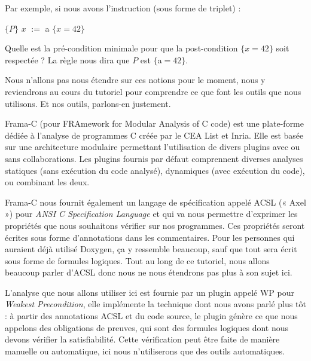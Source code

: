 \documentclass[middle]{zmdocument}
\begin{document}
Par exemple, si nous avons l'instruction (sous forme de triplet) :



$\{P\}$ $x$ $:=$ a $\{x = 42\}$



Quelle est la pré-condition minimale pour que la post-condition $\{x = 42\}$ 
soit respectée ? La règle nous dira que $P$ est $\{$a$=42\}$.



Nous n'allons pas nous étendre sur ces notions pour le moment, nous y 
reviendrons au cours du tutoriel pour comprendre ce que font les outils que
nous utilisons. Et nos outils, parlons-en justement.






\begin{center}


\end{center}




Frama-C (pour FRAmework for Modular Analysis of C code) est une plate-forme
 dédiée à l'analyse de programmes C créée par le CEA List et Inria. Elle est 
 basée sur une architecture modulaire permettant l'utilisation de divers 
 plugins avec ou sans collaborations. Les plugins fournis par défaut 
 comprennent diverses analyses statiques (sans exécution du code analysé), 
 dynamiques (avec exécution du code), ou combinant les deux.



Frama-C nous fournit également un langage de spécification appelé ACSL (« Axel »)
pour \textit{ANSI C Specification Language} et qui va nous permettre d'exprimer les 
propriétés que nous souhaitons vérifier sur nos programmes. Ces propriétés seront
écrites sous forme d'annotations dans les commentaires. Pour les personnes qui 
auraient déjà utilisé Doxygen, ça y ressemble beaucoup, sauf que tout sera 
écrit sous forme de formules logiques. Tout au long de ce tutoriel, nous allons 
beaucoup parler d'ACSL donc nous ne nous étendrons pas plus à son sujet ici.



L'analyse que nous allons utiliser ici est fournie par un plugin appelé WP pour
\textit{Weakest Precondition}, elle implémente la technique dont nous avons parlé plus tôt : 
à partir des annotations ACSL et du code source, le plugin génère ce que nous 
appelons des obligations de preuves, qui sont des formules logiques dont nous
devons vérifier la satisfiabilité. Cette vérification peut être faite de manière 
manuelle ou automatique, ici nous n'utiliserons que des outils automatiques.
\end{document}
